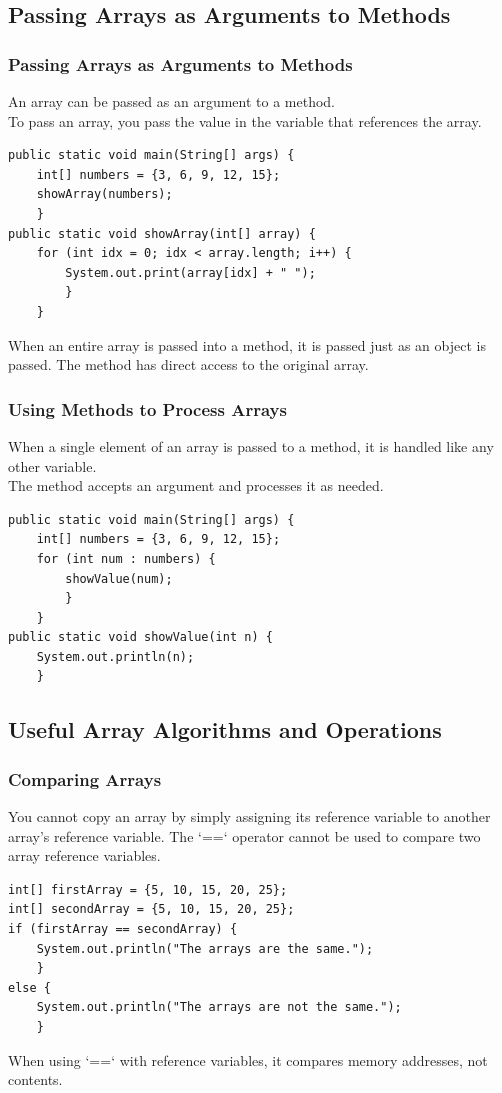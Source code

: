 \documentclass[11pt]{beamer}
\begin{document}
\subsection{Passing Arrays as Arguments to Methods}
\begin{frame}[fragile]
    \frametitle{Passing Arrays as Arguments to Methods}
    An array can be passed as an argument to a method. \\ \vspace{1em}
    To pass an array, you pass the value in the variable that references the array.
    \begin{lstlisting}
public static void main(String[] args) {
    int[] numbers = {3, 6, 9, 12, 15};
    showArray(numbers);
    }
public static void showArray(int[] array) {
    for (int idx = 0; idx < array.length; i++) {
        System.out.print(array[idx] + " ");
        }
    }
    \end{lstlisting}
    When an entire array is passed into a method, it is passed just as an object is passed. The method has direct access to the original array.
\end{frame}

\begin{frame}[fragile]
    \frametitle{Using Methods to Process Arrays}
    When a single element of an array is passed to a method, it is handled like any other variable. \\ \vspace{1em}
    The method accepts an argument and processes it as needed.
    \begin{lstlisting}
public static void main(String[] args) {
    int[] numbers = {3, 6, 9, 12, 15};
    for (int num : numbers) {
        showValue(num);
        }
    }
public static void showValue(int n) {
    System.out.println(n);
    }
    \end{lstlisting}
\end{frame}

\subsection{Useful Array Algorithms and Operations}
\begin{frame}[fragile]
    \frametitle{Comparing Arrays}
    You cannot copy an array by simply assigning its reference variable to another array's reference variable. The `==` operator cannot be used to compare two array reference variables.
    \begin{lstlisting}
int[] firstArray = {5, 10, 15, 20, 25};
int[] secondArray = {5, 10, 15, 20, 25};
if (firstArray == secondArray) {
    System.out.println("The arrays are the same.");
    }
else {
    System.out.println("The arrays are not the same.");
    }
    \end{lstlisting}
    When using `==` with reference variables, it compares memory addresses, not contents.
\end{frame}
\end{document}
